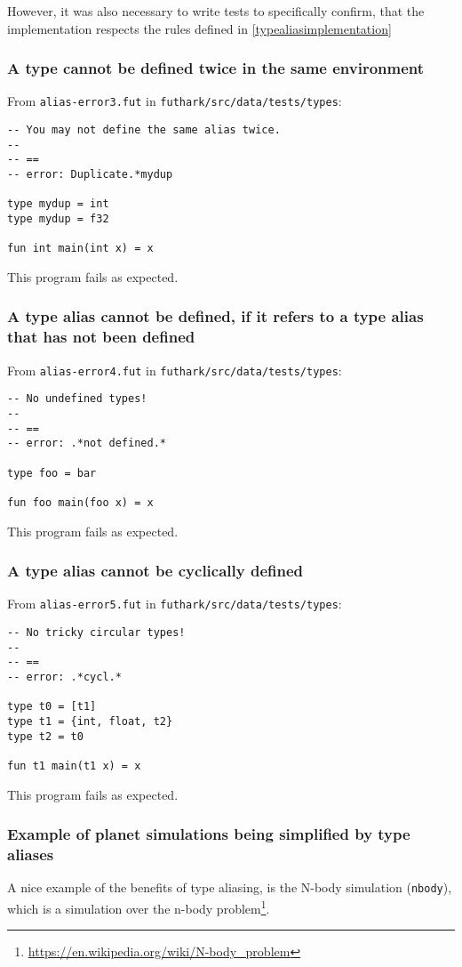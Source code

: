 However, it was also necessary to write tests to specifically confirm, that the
implementation respects the rules defined in \ref{typealiasimplementation}

\subsubsection{A type cannot be defined twice in the same environment}
From \texttt{alias-error3.fut} in \texttt{futhark/src/data/tests/types}:
\begin{verbatim}
-- You may not define the same alias twice.
--
-- ==
-- error: Duplicate.*mydup

type mydup = int
type mydup = f32

fun int main(int x) = x
\end{verbatim}

This program fails as expected.

\subsubsection{A type alias cannot be defined, if it refers to a type alias that has not been defined}
From \texttt{alias-error4.fut} in \texttt{futhark/src/data/tests/types}:
\begin{verbatim}
-- No undefined types!
--
-- ==
-- error: .*not defined.*

type foo = bar

fun foo main(foo x) = x
\end{verbatim}
This program fails as expected.

\subsubsection{A type alias cannot be cyclically defined}
From \texttt{alias-error5.fut} in \texttt{futhark/src/data/tests/types}:
\begin{verbatim}
-- No tricky circular types!
--
-- ==
-- error: .*cycl.*

type t0 = [t1]
type t1 = {int, float, t2}
type t2 = t0

fun t1 main(t1 x) = x
\end{verbatim}
This program fails as expected.
\clearpage
\subsubsection{Example of planet simulations being simplified by type aliases}\label{nbody}
A nice example of the benefits of type aliasing, is the N-body simulation
(\texttt{nbody}), which is a simulation over the n-body
problem\footnote{\url{https://en.wikipedia.org/wiki/N-body\_problem}}.

